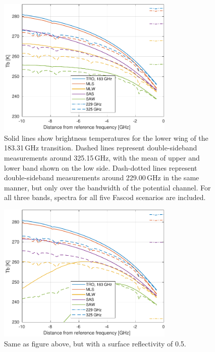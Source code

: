 \documentclass[12pt]{article}
\begin{document}
\begin{figure}[p]
  \centering
  \includegraphics[width=0.75\textwidth]{fascod_tb_r000}
  \caption{Solid lines show brightness temperatures for the lower wing of the
    183.31\,GHz transition. Dashed lines represent double-sideband measurements
    around 325.15\,GHz, with the mean of upper and lower band shown on the low
    side. Dash-dotted lines represent double-sideband measurements around
    229.00\,GHz in the same manner, but only over the bandwidth of the
    potential channel. For all three bands, spectra for all five
    Fascod scenarios are included.}
  \label{fig:tb:r000}
\end{figure}
\begin{figure}[p]
  \centering
  \includegraphics[width=0.75\textwidth]{fascod_tb_r050}
  \caption{Same as figure above, but with a surface reflectivity of 0.5.}
  \label{fig:tb:r050}
\end{figure}
\end{document}
